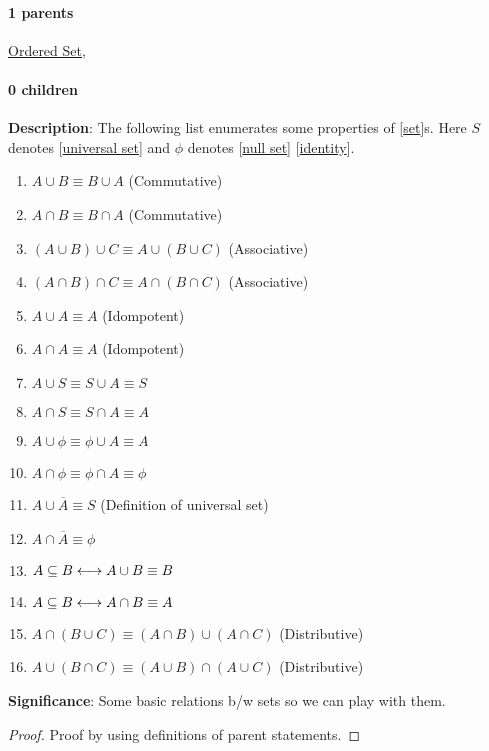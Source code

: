\documentclass[../main.tex]{subfiles}
\begin{document}
\paragraph{1 parents} \hyperref[statement:Ordered Set]{Ordered Set}, 
\paragraph{0 children} 



\begin{statement}
\label{statement:Properties of sets}\hspace*{0pt}\par
\end{statement}
\textbf{Description}:
The following list enumerates some properties of [\hyperref[statement:Set]{set}]s. Here $S$ denotes [\hyperref[statement:Universal Set]{universal set}] and $\phi$ denotes [\hyperref[statement:Null Set]{null set}] [\hyperref[statement:Identity]{identity}].
\begin{enumerate}[nolistsep]
  \item $ A \cup B \equiv B \cup A $ (Commutative)
  \item $ A \cap B \equiv B \cap A $ (Commutative)
  \item $ (A \cup B) \cup C \equiv A \cup (B \cup C) $ (Associative)
  \item $ (A \cap B) \cap C \equiv A \cap (B \cap C) $ (Associative)
  \item $ A \cup A \equiv A$ (Idompotent)
  \item $ A \cap A \equiv A$ (Idompotent)
  \item $ A \cup S \equiv S \cup A \equiv S $
  \item $ A \cap S \equiv S \cap A \equiv A $
  \item $ A \cup \phi \equiv \phi \cup A \equiv A $
  \item $ A \cap \phi \equiv \phi \cap A \equiv \phi $
  \item $ A \cup \overline{A} \equiv S$ (Definition of universal set)
  \item $ A \cap \overline{A} \equiv \phi$
  \item $ A \subseteq B \longleftrightarrow A \cup B \equiv B $
  \item $ A \subseteq B \longleftrightarrow A \cap B \equiv A $
  \item $ A \cap (B \cup C) \equiv (A \cap B) \cup (A \cap C) $ (Distributive)
  \item $ A \cup (B \cap C) \equiv (A \cup B) \cap (A \cup C) $ (Distributive)
\end{enumerate}
\par
{\color{magenta} \textbf{Significance}:
Some basic relations b/w sets so we can play with them.
\par}
\begin{proof}
Proof by using definitions of parent statements.
\end{proof}\par
\end{document}
